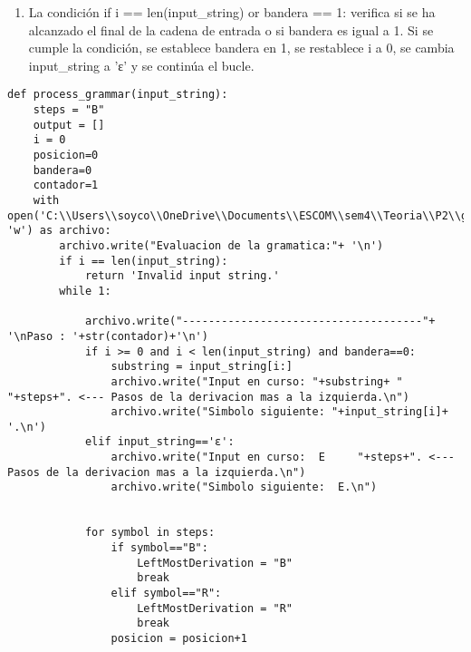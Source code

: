 \begin{enumerate}
\begin{enumerate}
    \item La condición if i == len(input\_string) or bandera == 1: verifica si se ha alcanzado el final de la cadena de entrada o si bandera es igual a 1. Si se cumple la condición, se establece bandera en 1, se restablece i a 0, se cambia input\_string a 'ε' y se continúa el bucle.\newline
\end{enumerate}
\begin{lstlisting}
def process_grammar(input_string):
    steps = "B"
    output = []
    i = 0
    posicion=0
    bandera=0
    contador=1
    with open('C:\\Users\\soyco\\OneDrive\\Documents\\ESCOM\\sem4\\Teoria\\P2\\gramatica\\output\\evaluacion.txt', 'w') as archivo:
        archivo.write("Evaluacion de la gramatica:"+ '\n')
        if i == len(input_string):
            return 'Invalid input string.'
        while 1:
            
            archivo.write("-------------------------------------"+ '\nPaso : '+str(contador)+'\n')
            if i >= 0 and i < len(input_string) and bandera==0:
                substring = input_string[i:]
                archivo.write("Input en curso: "+substring+ "     "+steps+". <--- Pasos de la derivacion mas a la izquierda.\n")
                archivo.write("Simbolo siguiente: "+input_string[i]+ '.\n')
            elif input_string=='ε':
                archivo.write("Input en curso:  E     "+steps+". <--- Pasos de la derivacion mas a la izquierda.\n")
                archivo.write("Simbolo siguiente:  E.\n")
            

            for symbol in steps:
                if symbol=="B":
                    LeftMostDerivation = "B"
                    break
                elif symbol=="R":
                    LeftMostDerivation = "R"
                    break
                posicion = posicion+1
            

\end{lstlisting}
\end{enumerate}
